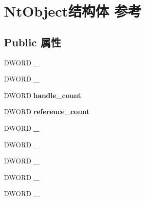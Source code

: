 \hypertarget{struct_nt_object}{}\section{Nt\+Object结构体 参考}
\label{struct_nt_object}
\subsection*{Public 属性}
\begin{DoxyCompactItemize}
\item 
\mbox{\label{struct_nt_object_aeb3364f9e35a1ed4887aa969344406ac}} 
D\+W\+O\+RD {\bfseries \+\_}
\item 
\mbox{\label{struct_nt_object_ace9336feebabdc39a7570b94dcf9583f}} 
D\+W\+O\+RD {\bfseries \+\_}
\item 
\mbox{\label{struct_nt_object_a05396eeaaff184416ae13ad200b07ff1}} 
D\+W\+O\+RD {\bfseries handle\+\_\+count}
\item 
\mbox{\label{struct_nt_object_a83800f7fd6e91743c4d90ed43ba5df0d}} 
D\+W\+O\+RD {\bfseries reference\+\_\+count}
\item 
\mbox{\label{struct_nt_object_a897db304c4b8dc79a1d99546759fe230}} 
D\+W\+O\+RD {\bfseries \+\_}
\item 
\mbox{\label{struct_nt_object_ac999c6b5010a2ac733b485f03e2123f1}} 
D\+W\+O\+RD {\bfseries \+\_}
\item 
\mbox{\label{struct_nt_object_a5d02f5dfccc4b99cb804f69ebbc0109f}} 
D\+W\+O\+RD {\bfseries \+\_}
\item 
\mbox{\label{struct_nt_object_a412f9b5fd5d12eb6cf93df22690c85b2}} 
D\+W\+O\+RD {\bfseries \+\_}
\item 
\mbox{\label{struct_nt_object_a64b91c67860e30dfff7bd79d6881c78b}} 
D\+W\+O\+RD {\bfseries \+\_}
\item 
\mbox{\label{struct_nt_object_a0edac6e063171ec763ef7d5f538c3a71}} 

\end{DoxyCompactItemize}
